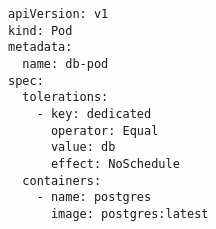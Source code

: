 \begin{verbatim}
apiVersion: v1
kind: Pod
metadata:
  name: db-pod
spec:
  tolerations:
    - key: dedicated
      operator: Equal
      value: db
      effect: NoSchedule
  containers:
    - name: postgres
      image: postgres:latest
\end{verbatim}
